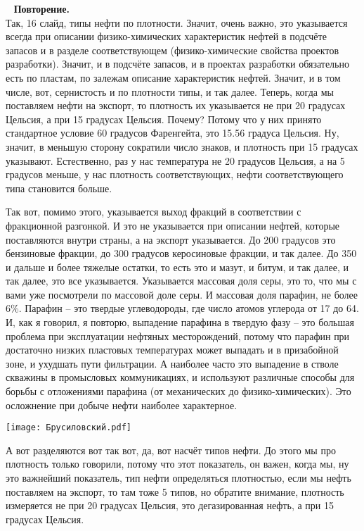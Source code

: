 \documentclass[main.tex]{subfiles}
\begin{document}
\ \newline
\textbf{Повторение.}\\
Так, 16 слайд, типы нефти по плотности.
Значит, очень важно, это указывается всегда при описании физико-химических характеристик нефтей в подсчёте запасов и в разделе соответствующем (физико-химические свойства проектов разработки).
Значит, и в подсчёте запасов, и в проектах разработки обязательно есть по пластам, по залежам описание характеристик нефтей.
Значит, и в том числе, вот, сернистость и по плотности типы, и так далее.
Теперь, когда мы поставляем нефти на экспорт, то плотность их указывается не при 20 градусах Цельсия, а при 15 градусах Цельсия.
Почему?
Потому что у них принято стандартное условие 60 градусов Фаренгейта, это 15.56 градуса Цельсия.
Ну, значит, в меньшую сторону сократили число знаков, и плотность при 15 градусах указывают.
Естественно, раз у нас температура не 20 градусов Цельсия, а на 5 градусов меньше, у нас плотность соответствующих, нефти соответствующего типа становится больше.

Так вот, помимо этого, указывается выход фракций в соответствии с фракционной разгонкой.
И это не указывается при описании нефтей, которые поставляются внутри страны, а на экспорт указывается.
До 200 градусов это бензиновые фракции, до 300 градусов керосиновые фракции, и так далее.
До 350 и дальше и более тяжелые остатки, то есть это и мазут, и битум, и так далее, и так далее, это все указывается.
Указывается массовая доля серы, это то, что мы с вами уже посмотрели по массовой доле серы.
И массовая доля парафин, не более 6\%.
Парафин -- это твердые углеводороды, где число атомов углерода от 17 до 64.
И, как я говорил, я повторю, выпадение парафина в твердую фазу -- это большая проблема при эксплуатации нефтяных месторождений, потому что парафин при достаточно низких пластовых температурах может выпадать и в призабойной зоне, и ухудшать пути фильтрации.
А наиболее часто это выпадение в стволе скважины в промысловых коммуникациях, и используют различные способы для борьбы с отложениями парафина (от механических до физико-химических).
Это осложнение при добыче нефти наиболее характерное.

\begin{center}
\texttt{[image: Брусиловский.pdf]}
\end{center}

А вот разделяются вот так вот, да, вот насчёт типов нефти.
До этого мы про плотность только говорили, потому что этот показатель, он важен, когда мы, ну это важнейший показатель, тип нефти определяться плотностью, если мы нефть поставляем на экспорт, то там тоже 5 типов, но обратите внимание, плотность измеряется не при 20 градусах Цельсия, это дегазированная нефть, а при 15 градусах Цельсия.
\end{document}
